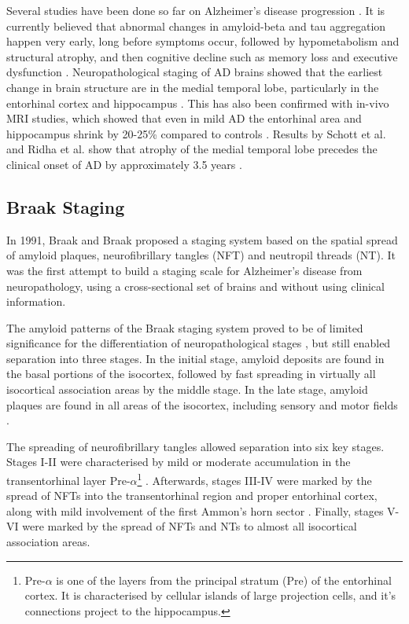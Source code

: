 Several studies have been done so far on Alzheimer's disease progression \cite{jack2010hypothetical, ridha2006tracking,fox1999correlation, scahill2002mapping, braak1991neuropathological,schott2003assessing}. It is currently believed that abnormal changes in amyloid-beta and tau aggregation happen very early, long before symptoms occur, followed by hypometabolism and structural atrophy, and then cognitive decline such as memory loss and executive dysfunction \cite{jack2010hypothetical,jack2013tracking}.  Neuropathological staging of AD brains showed that the earliest change in brain structure are in the medial temporal lobe, particularly in the entorhinal cortex and hippocampus \cite{braak1991neuropathological}. This has also been confirmed with in-vivo MRI studies, which showed that even in mild AD the entorhinal area and hippocampus shrink by 20-25\% compared to controls \cite{jack1997medial, lehericy1994amygdalohippocampal, juottonen1999comparative, bobinski1999histological}. Results by Schott et al. \cite{schott2003assessing} and Ridha et al. \cite{ridha2006tracking} show that atrophy of the medial temporal lobe precedes the clinical onset of AD by approximately 3.5 years \cite{schott2003assessing}. 

\subsection{Braak Staging}
\label{sec:bckBraak}

In 1991, Braak and Braak \cite{braak1991neuropathological} proposed a staging system based on the spatial spread of amyloid plaques, neurofibrillary tangles (NFT) and neutropil threads (NT). It was the first attempt to build a staging scale for Alzheimer's disease from neuropathology, using a cross-sectional set of brains and without using clinical information.

The amyloid patterns of the Braak staging system proved to be of limited significance for the differentiation of neuropathological stages \cite{braak1991neuropathological}, but still enabled separation into three stages. In the initial stage, amyloid deposits are found in the basal portions of the isocortex, followed by fast spreading in virtually all isocortical association areas by the middle stage. In the late stage, amyloid plaques are found in all areas of the isocortex, including sensory and motor fields \cite{braak1991neuropathological}.

The spreading of neurofibrillary tangles allowed separation into six key stages. Stages I-II were characterised by mild or moderate accumulation in the transentorhinal layer Pre-$\alpha$\footnote{Pre-$\alpha$ is one of the layers from the principal stratum (Pre) of the entorhinal cortex. It is characterised by cellular islands of large projection cells, and it's connections project to the hippocampus.} \cite{braak1991neuropathological}. Afterwards, stages III-IV were marked by the spread of NFTs into the transentorhinal region and proper entorhinal cortex, along with mild involvement of the first Ammon's horn sector \cite{braak1991neuropathological}. Finally, stages V-VI were marked by the spread of NFTs and NTs to almost all isocortical association areas. \cite{braak1991neuropathological}

